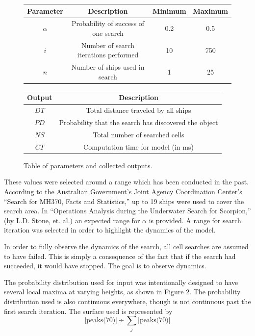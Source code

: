 \documentclass[a4paper]{article}
\begin{document}
\begin{figure}[H]\begin{center}\begin{tabular}{|c|c|c|c|}
\hline \textbf{Parameter} & \textbf{Description} & \textbf{Minimum} & \textbf{Maximum}\\\hline\hline
$\alpha$ & Probability of success of one search & 0.2 & 0.5 \\\hline
$i$ & Number of search iterations performed & 10 & 750 \\\hline
$n$ & Number of ships used in search & 1 & 25 \\\hline
\end{tabular}\vspace{5pt}
\begin{tabular}{|c|c|}
\hline\textbf{Output} & \textbf{Description} \\\hline\hline
$DT$ & Total distance traveled by all ships \\\hline
$PD$ & Probability that the search has discovered the object\\\hline
$NS$ & Total number of searched cells\\\hline
$CT$ & Computation time for model (in ms)\\\hline
\end{tabular}\end{center}
\caption{Table of parameters and collected outputs.}
\end{figure}

These values were selected around a range which has been conducted in the past.  According to the Australian Government's Joint Agency Coordination Center's ``Search for MH370, Facts and Statistics,'' up to 19 ships were used to cover the search area. In ``Operations Analysis during the Underwater Search for Scorpion,'' (by L.D. Stone, et. al.) an expected range for $\alpha$ is provided.  A range for search iteration was selected in order to highlight the dynamics of the model.

In order to fully observe the dynamics of the search, all cell searches are assumed to have failed. This is simply a consequence of the fact that if the search had succeeded, it would have stopped. The goal is to observe dynamics.

The probability distribution used for input was intentionally designed to have several local maxima at varying heights, as shown in Figure 2. The probability distribution used is also continuous everywhere, though is not continuous past the first search iteration. The surface used is represented by $$|\mbox{peaks(70)}|\div \sum_j |\text{peaks(70)}|$$
\end{document}
